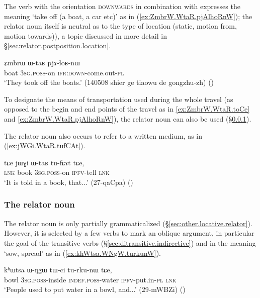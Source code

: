 The verb  with the orientation \textsc{downwards} in combination with  expresses the meaning `take off (a boat, a car etc)' as in (\ref{ex:ZmbrW.WtaR.pjAlhoRnW}); the relator noun itself is neutral as to the type of location (static, motion from, motion towards)), a topic discussed in more detail in §\ref{sec:relator.postposition.location}.

\begin{exe}
\ex \label{ex:ZmbrW.WtaR.pjAlhoRnW}
\gll ʑmbrɯ ɯ-taʁ pjɤ-ɬoʁ-nɯ  \\
boat \textsc{3sg}.\textsc{poss}-on \textsc{ifr}:\textsc{down}-come.out-\textsc{pl} \\
\glt `They took off the boats.' (140508 shier ge tiaowu de gongzhu-zh) ()
\end{exe} 

To designate the means of transportation used during the whole  travel (as opposed to the begin and end points of the travel as in \ref{ex:ZmbrW.WtaR.toCe} and \ref{ex:ZmbrW.WtaR.pjAlhoRnW}), the relator noun  can also be used (§\ref{sec:WNgW}).

The relator noun  also occurs to refer to a written medium, as in (\ref{ex:jWGi.WtaR.tufCAt}).

\begin{exe}
\ex \label{ex:jWGi.WtaR.tufCAt}
\gll  tɕe jɯɣi ɯ-taʁ tu-fɕɤt tɕe, \\
\textsc{lnk} book \textsc{3sg}.\textsc{poss}-on \textsc{ipfv}-tell \textsc{lnk} \\
\glt `It is told in a book, that...' (27-qaCpa) 	()
\end{exe} 

\subsubsection{The relator noun } \label{sec:WNgW}
The relator noun  is only partially grammaticalized (§\ref{sec:other.locative.relator}). However, it is selected by a few verbs to mark an oblique argument, in particular the goal of the transitive verbs  (§\ref{sec:ditransitive.indirective}) and  in the meaning `sow, spread' as in (\ref{ex:khWtsa.WNgW.turkunW}).

\begin{exe}
\ex \label{ex:khWtsa.WNgW.turkunW}
\gll kʰɯtsa ɯ-ŋgɯ tɯ-ci tu-rku-nɯ tɕe, \\
bowl \textsc{3sg}.\textsc{poss}-inside  \textsc{indef}.\textsc{poss}-water \textsc{ipfv}-put.in-\textsc{pl} \textsc{lnk} \\
\glt `People used to put water in a bowl, and...' (29-mWBZi)
()
\end{exe} 

